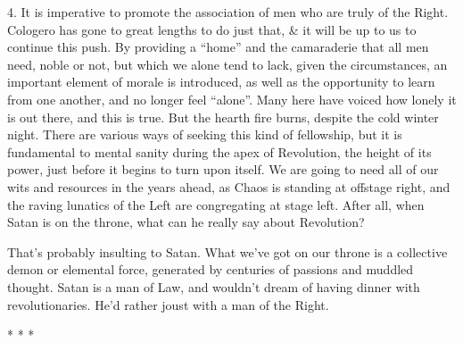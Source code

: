 4. It is imperative to promote the association of men who are truly of the Right. Cologero has gone to great lengths to do just that, \& it will be up to us to continue this push. By providing a ``home'' and the camaraderie that all men need, noble or not, but which we alone tend to lack, given the circumstances, an important element of morale is introduced, as well as the opportunity to learn from one another, and no longer feel ``alone''. Many here have voiced how lonely it is out there, and this is true. But the hearth fire burns, despite the cold winter night. There are various ways of seeking this kind of fellowship, but it is fundamental to mental sanity during the apex of Revolution, the height of its power, just before it begins to turn upon itself. We are going to need all of our wits and resources in the years ahead, as Chaos is standing at offstage right, and the raving lunatics of the Left are congregating at stage left. After all, when Satan is on the throne, what can he really say about Revolution?

That's probably insulting to Satan. What we've got on our throne is a collective demon or elemental force, generated by centuries of passions and muddled thought. Satan is a man of Law, and wouldn't dream of having dinner with revolutionaries. He'd rather joust with a man of the Right.



\begin{center}* * *\end{center}

